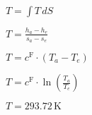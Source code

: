 \( T = \int T \, dS \)  

\( T = \frac{h_a - h_e}{s_a - s_e} \)  

\( T = c^{\text{F}} \cdot (T_a - T_e) \)  

\( T = c^{\text{F}} \cdot \ln \left( \frac{T_a}{T_e} \right) \)  

\( T = 293.72 \, \text{K} \)